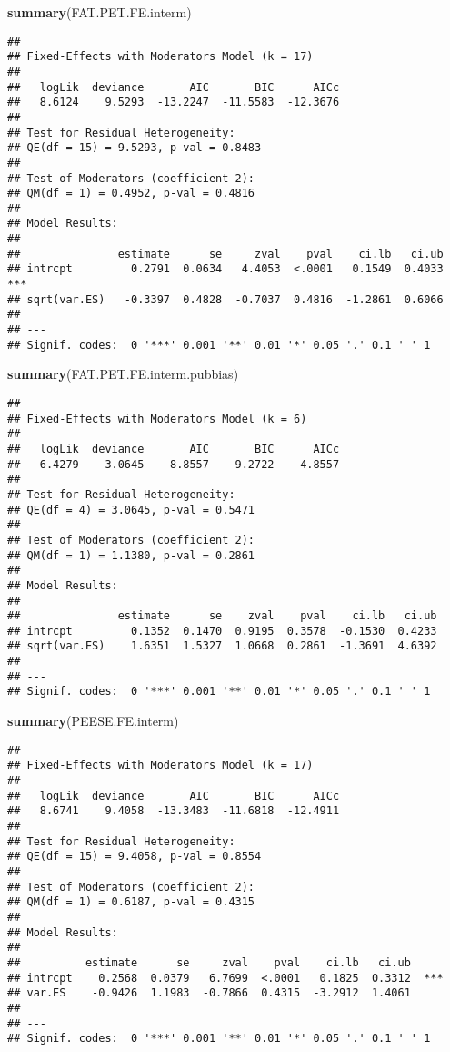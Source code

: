 \documentclass[]{book}
\newenvironment{Shaded}{\begin{snugshade}}{\end{snugshade}}
\newcommand{\KeywordTok}[1]{\textcolor[rgb]{0.13,0.29,0.53}{\textbf{#1}}}
\newcommand{\NormalTok}[1]{#1}
\theoremstyle{definition}
\theoremstyle{definition}
\theoremstyle{definition}
\theoremstyle{remark}
\begin{document}
\begin{Shaded}
\begin{Highlighting}[]
\KeywordTok{summary}\NormalTok{(FAT.PET.FE.interm)}
\end{Highlighting}
\end{Shaded}

\begin{verbatim}
## 
## Fixed-Effects with Moderators Model (k = 17)
## 
##   logLik  deviance       AIC       BIC      AICc 
##   8.6124    9.5293  -13.2247  -11.5583  -12.3676   
## 
## Test for Residual Heterogeneity:
## QE(df = 15) = 9.5293, p-val = 0.8483
## 
## Test of Moderators (coefficient 2):
## QM(df = 1) = 0.4952, p-val = 0.4816
## 
## Model Results:
## 
##               estimate      se     zval    pval    ci.lb   ci.ub 
## intrcpt         0.2791  0.0634   4.4053  <.0001   0.1549  0.4033  *** 
## sqrt(var.ES)   -0.3397  0.4828  -0.7037  0.4816  -1.2861  0.6066      
## 
## ---
## Signif. codes:  0 '***' 0.001 '**' 0.01 '*' 0.05 '.' 0.1 ' ' 1
\end{verbatim}

\begin{Shaded}
\begin{Highlighting}[]
\KeywordTok{summary}\NormalTok{(FAT.PET.FE.interm.pubbias)}
\end{Highlighting}
\end{Shaded}

\begin{verbatim}
## 
## Fixed-Effects with Moderators Model (k = 6)
## 
##   logLik  deviance       AIC       BIC      AICc 
##   6.4279    3.0645   -8.8557   -9.2722   -4.8557   
## 
## Test for Residual Heterogeneity:
## QE(df = 4) = 3.0645, p-val = 0.5471
## 
## Test of Moderators (coefficient 2):
## QM(df = 1) = 1.1380, p-val = 0.2861
## 
## Model Results:
## 
##               estimate      se    zval    pval    ci.lb   ci.ub 
## intrcpt         0.1352  0.1470  0.9195  0.3578  -0.1530  0.4233    
## sqrt(var.ES)    1.6351  1.5327  1.0668  0.2861  -1.3691  4.6392    
## 
## ---
## Signif. codes:  0 '***' 0.001 '**' 0.01 '*' 0.05 '.' 0.1 ' ' 1
\end{verbatim}

\begin{Shaded}
\begin{Highlighting}[]
\KeywordTok{summary}\NormalTok{(PEESE.FE.interm)}
\end{Highlighting}
\end{Shaded}

\begin{verbatim}
## 
## Fixed-Effects with Moderators Model (k = 17)
## 
##   logLik  deviance       AIC       BIC      AICc 
##   8.6741    9.4058  -13.3483  -11.6818  -12.4911   
## 
## Test for Residual Heterogeneity:
## QE(df = 15) = 9.4058, p-val = 0.8554
## 
## Test of Moderators (coefficient 2):
## QM(df = 1) = 0.6187, p-val = 0.4315
## 
## Model Results:
## 
##          estimate      se     zval    pval    ci.lb   ci.ub 
## intrcpt    0.2568  0.0379   6.7699  <.0001   0.1825  0.3312  *** 
## var.ES    -0.9426  1.1983  -0.7866  0.4315  -3.2912  1.4061      
## 
## ---
## Signif. codes:  0 '***' 0.001 '**' 0.01 '*' 0.05 '.' 0.1 ' ' 1
\end{verbatim}
\end{document}
